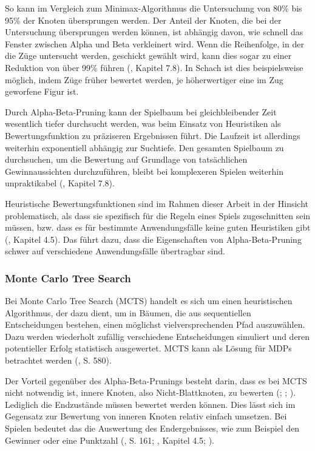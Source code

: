 So kann im Vergleich zum Minimax-Algorithmus die Untersuchung von 80\% bis 95\% der Knoten übersprungen werden. Der Anteil der Knoten, die bei der Untersuchung übersprungen werden können, ist abhängig davon, wie schnell das Fenster zwischen Alpha und Beta verkleinert wird. Wenn die Reihenfolge, in der die Züge untersucht werden, geschickt gewählt wird, kann dies sogar zu einer Reduktion von über 99\% führen (\cite{Heineman.October2008}, Kapitel 7.8). In Schach ist dies beispielsweise möglich, indem Züge früher bewertet werden, je höherwertiger eine im Zug geworfene Figur ist.

Durch Alpha-Beta-Pruning kann der Spielbaum bei gleichbleibender Zeit wesentlich tiefer durchsucht werden, was beim Einsatz von Heuristiken als Bewertungsfunktion zu präziseren Ergebnissen führt. Die Laufzeit ist allerdings weiterhin exponentiell abhängig zur Suchtiefe. Den gesamten Spielbaum zu durchsuchen, um die Bewertung auf Grundlage von tatsächlichen Gewinnaussichten durchzuführen, bleibt bei komplexeren Spielen weiterhin unpraktikabel (\cite{Heineman.October2008}, Kapitel 7.8).

Heuristische Bewertungsfunktionen sind im Rahmen dieser Arbeit in der Hinsicht problematisch, als dass sie spezifisch für die Regeln eines Spiels zugeschnitten sein müssen, bzw. dass es für bestimmte Anwendungsfälle keine guten Heuristiken gibt (\cite{Ferguson.January2019}, Kapitel 4.5). Das führt dazu, dass die Eigenschaften von Alpha-Beta-Pruning schwer auf verschiedene Anwendungsfälle übertragbar sind.

\subsubsection{Monte Carlo Tree Search}

\label{mcts}

Bei Monte Carlo Tree Search (MCTS) handelt es sich um einen heuristischen Algorithmus, der dazu dient, um in Bäumen, die aus sequentiellen Entscheidungen bestehen, einen möglichst vielversprechenden Pfad auszuwählen. Dazu werden wiederholt zufällig verschiedene Entscheidungen simuliert und deren potentieller Erfolg statistisch ausgewertet. MCTS kann als Lösung für MDPs betrachtet werden (\cite{Russell.2020}, S. 580).

Der Vorteil gegenüber des Alpha-Beta-Prunings besteht darin, dass es bei MCTS nicht notwendig ist, innere Knoten, also Nicht-Blattknoten, zu bewerten (\cite{Russell.2020}; \cite{Ferguson.January2019}; \cite{Browne.2012}). Lediglich die Endzustände müssen bewertet werden können. Dies lässt sich im Gegensatz zur Bewertung von inneren Knoten relativ einfach umsetzen. Bei Spielen bedeutet das die Auswertung des Endergebnisses, wie zum Beispiel den Gewinner oder eine Punktzahl (\cite{Russell.2020}, S. 161; \cite{Ferguson.January2019}, Kapitel 4.5; \cite{Browne.2012}).

